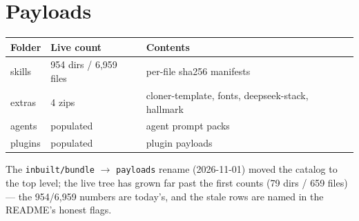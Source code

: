 \section{Payloads}

\begin{tabular}{@{}lll@{}}
\toprule
Folder & Live count & Contents\\
\midrule
skills & 954 dirs / 6{,}959 files & per-file sha256 manifests\\
extras & 4 zips & cloner-template, fonts, deepseek-stack, hallmark\\
agents & populated & agent prompt packs\\
plugins & populated & plugin payloads\\
\bottomrule
\end{tabular}

\medskip
The \texttt{inbuilt/bundle} $\to$ \texttt{payloads} rename (2026-11-01) moved the catalog to
the top level; the live tree has grown far past the first counts (79 dirs / 659 files) --- the
954/6{,}959 numbers are today's, and the stale rows are named in the README's honest flags.
